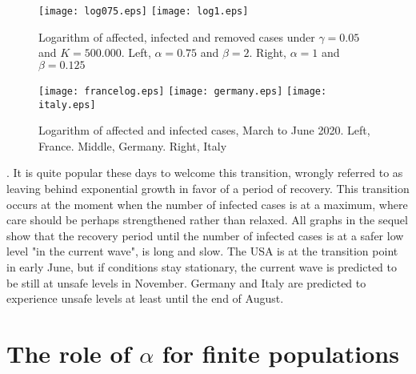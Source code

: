 \documentclass{article}
\begin{document}
\begin{figure}
\begin{center}
{\texttt{[image: log075.eps]}}
\qquad
{\texttt{[image: log1.eps]}}
\end{center}
\caption{Logarithm of affected, infected and removed cases under $\gamma=0.05$  and $K=500.000$. Left, $\alpha=0.75$ and $\beta=2$. Right, $\alpha=1$  and $\beta=0.125$}
\label{log075}
\end{figure}


\bigskip

\begin{figure}
\begin{center}
{\texttt{[image: francelog.eps]}}
 \qquad
{\texttt{[image: germany.eps]}}
 \qquad
{\texttt{[image: italy.eps]}}
\end{center}
\caption{Logarithm of affected and infected cases, March to June 2020. Left, France. Middle, Germany. Right, Italy}
\label{france}
\end{figure}


. It is quite popular these days to welcome this transition, wrongly referred to as leaving behind exponential growth in favor of a period of recovery. This transition occurs at the moment when the number of infected cases is at a maximum, where care should be perhaps strengthened rather than relaxed. All graphs in the sequel show that the recovery period until the number of infected cases is at a safer low level "in the current wave", is long and slow.  The USA is at the transition point in early June, but if conditions stay stationary, the current wave is predicted to be still at unsafe levels in November. Germany and Italy are predicted to experience unsafe levels at least until the end of August.

 

\section{The role of $\alpha$ for finite populations}
\end{document}
